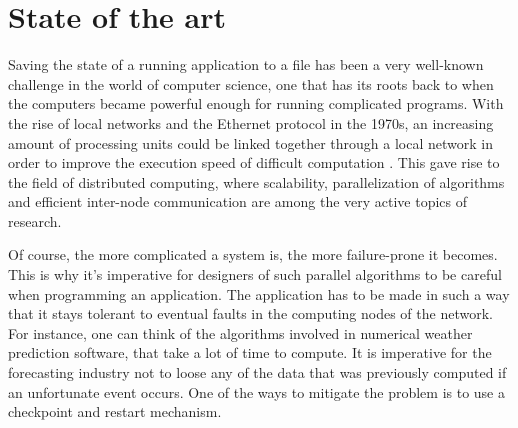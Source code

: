 {
\setlength{\parindent}{2em}
\chapter{State of the art}\label{cha:state-of-the-art}
Saving the state of a running application to a file has been a very well-known challenge in the world of computer science, one that has its roots back to when the computers became powerful enough for running complicated programs. With the rise of local networks and the Ethernet protocol in the 1970s, an increasing amount of processing units could be linked together through a local network in order to improve the execution speed of difficult computation \cite{book:andrews}. This gave rise to the field of distributed computing, where scalability, parallelization of algorithms and efficient inter-node communication are among the very active topics of research.

Of course, the more complicated a system is, the more failure-prone it becomes. This is why it's imperative for designers of such parallel algorithms to be careful when programming an application. The application has to be made in such a way that it stays tolerant to eventual faults in the computing nodes of the network. For instance, one can think of the algorithms involved in numerical weather prediction software, that take a lot of time to compute. It is imperative for the forecasting industry not to loose any of the data that was previously computed if an unfortunate event occurs. One of the ways to mitigate the problem is to use a checkpoint and restart mechanism.

}
